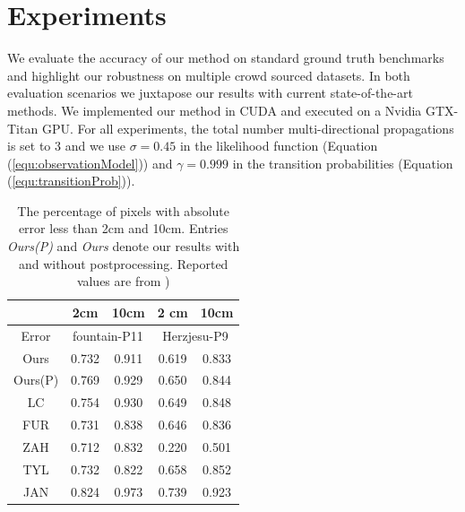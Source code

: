  

\section{Experiments} \label{sec:experiment}
We evaluate the accuracy of our method on standard ground truth benchmarks and highlight our robustness on multiple crowd sourced datasets.
In both evaluation scenarios we juxtapose our results with current state-of-the-art methods.
We implemented our method in CUDA and executed on a Nvidia GTX-Titan GPU.
For all experiments, the total number multi-directional propagations is set to 3 and we use  $\sigma = 0.45$ in the likelihood function (Equation (\ref{equ:observationModel})) and $\gamma=0.999$ in the transition probabilities (Equation (\ref{equ:transitionProb})).  %

\begin{table}[t]
\centering
    \begin{tabular}{|c|c|c|c|c|}
    \hline
         &  2cm &  10cm  & 2 cm & 10cm\\
    \hline
    Error & \multicolumn{2}{|c|}{fountain-P11} & \multicolumn{2}{|c|}{Herzjesu-P9}        \\
    \hline
    Ours & 0.732   & 0.911  & 0.619 & 0.833\\
    \hline
    Ours(P)& 0.769   & 0.929  & 0.650 & 0.844\\
    \hline
    LC \cite{LeastCommitment_3DIMPVT2012} & 0.754 &  {0.930} & 0.649 & 0.848 \\
    \hline
    FUR \cite{FURUKAWA_PAMI2010} & 0.731 & 0.838 & 0.646  & 0.836\\
    \hline
    ZAH \cite{Zaharescu_PAMI2011} & 0.712 & 0.832 & 0.220 & 0.501\\
    \hline
    TYL \cite{TYL} &0.732 & 0.822 & 0.658 & 0.852\\
    \hline
    JAN \cite{JAN} &0.824 & 0.973 & 0.739 & 0.923\\
    \hline
    \end{tabular}
\caption{The percentage of pixels with absolute error less than 2cm and 10cm. Entries {\em Ours(P)}  and {\em Ours}  denote our results with and without postprocessing.  Reported values are from \citet{LeastCommitment_3DIMPVT2012})}
\label{tab:data}
\end{table}

